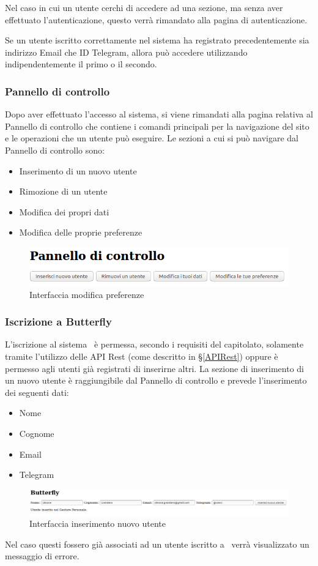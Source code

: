 Nel caso in cui un utente cerchi di accedere ad una sezione, ma senza aver effettuato l'autenticazione, questo verrà rimandato alla pagina di autenticazione.\par
Se un utente iscritto correttamente nel sistema ha registrato precedentemente sia indirizzo Email che ID Telegram, allora può accedere utilizzando indipendentemente il primo o il secondo.

\subsubsection{Pannello di controllo}
Dopo aver effettuato l'accesso al sistema, si viene rimandati alla pagina relativa al Pannello di controllo che contiene i comandi principali per la navigazione del sito e le operazioni che un utente può eseguire.
Le sezioni a cui si può navigare dal Pannello di controllo sono:
\begin{itemize}
	\item Inserimento di un nuovo utente
	\item Rimozione di un utente
	\item Modifica dei propri dati
	\item Modifica delle proprie preferenze
\end{itemize}
\begin{figure}[H]
	\centering
	\includegraphics[width=14cm]{img/pannello_1.png}
	\caption{Interfaccia modifica preferenze}
\end{figure}

\subsubsection{Iscrizione a Butterfly}
L'iscrizione al sistema \progetto\ è permessa, secondo i requisiti del capitolato, solamente tramite l'utilizzo delle API Rest (come descritto in \S\ref{APIRest}) oppure è permesso agli utenti già registrati di inserirne altri.
La sezione di inserimento di un nuovo utente è raggiungibile dal Pannello di controllo e prevede l'inserimento dei seguenti dati:
\begin{itemize}
	\item Nome
	\item Cognome
	\item Email
	\item Telegram
\end{itemize}
\begin{figure}[H]
	\centering
	\includegraphics[width=\textwidth]{img/inserimento_1.png}
	\caption{Interfaccia inserimento nuovo utente}
\end{figure}
Nel caso questi fossero già associati ad un utente iscritto a \progetto\ verrà visualizzato un messaggio di errore.

